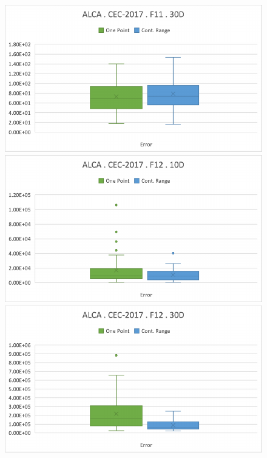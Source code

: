 \documentclass[graybox]{svmult}
\begin{document}
\begin{figure}[!ht]
\begin{minipage}[h]{0.49\linewidth}
        \end{minipage}
        \hfill
        \begin{minipage}[h]{0.49\linewidth}
            \includegraphics[width=1\linewidth]{img/fig_experiment_F11x30D.pdf} 
        \end{minipage}
        \vfill
        \vspace{0.05 cm}
        \begin{minipage}[h]{0.49\linewidth}
            \includegraphics[width=1\linewidth]{img/fig_experiment_F12x10D.pdf} 
        \end{minipage}
        \hfill
        \begin{minipage}[h]{0.49\linewidth}
            \includegraphics[width=1\linewidth]{img/fig_experiment_F12x30D.pdf} 

\end{minipage}
\end{figure}
\end{document}
